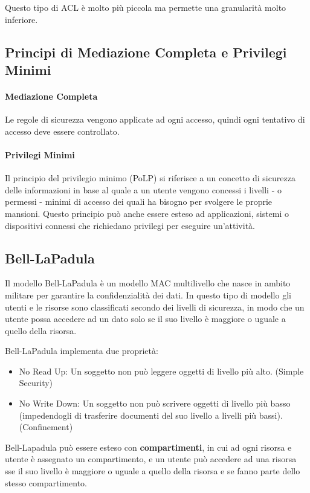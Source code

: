 \documentclass[12pt, a4paper, openany]{book}
\begin{document}
Questo tipo di ACL è molto più piccola ma permette una granularità molto inferiore.

\subsection{Principi di Mediazione Completa e Privilegi Minimi}
\paragraph{Mediazione Completa} Le regole di sicurezza vengono applicate ad ogni accesso, quindi ogni tentativo di accesso deve essere controllato.
\paragraph{Privilegi Minimi} Il principio del privilegio minimo (PoLP) si riferisce a un concetto di sicurezza delle informazioni in base al quale a un utente vengono concessi i livelli - o permessi - minimi di accesso dei quali ha bisogno per svolgere le proprie mansioni.
Questo principio può anche essere esteso ad applicazioni, sistemi o dispositivi connessi che richiedano privilegi per eseguire un'attività.

\subsection{Bell-LaPadula}
Il modello Bell-LaPadula è un modello MAC multilivello che nasce in ambito militare per garantire la confidenzialità dei dati.
In questo tipo di modello gli utenti e le risorse sono classificati secondo dei livelli di sicurezza, in modo che un utente possa accedere ad un dato solo se il suo livello è maggiore o uguale a quello della risorsa.

Bell-LaPadula implementa due proprietà:
\begin{itemize}
    \item No Read Up: Un soggetto non può leggere oggetti di livello più alto. (Simple Security)
    \item No Write Down: Un soggetto non può scrivere oggetti di livello più basso (impedendogli di trasferire documenti del suo livello a livelli più bassi). (Confinement)
\end{itemize}

Bell-Lapadula può essere esteso con \textbf{compartimenti}, in cui ad ogni risorsa e utente è assegnato un compartimento, e un utente può accedere ad una risorsa sse il suo livello è maggiore o uguale a quello della risorsa e se fanno parte dello stesso compartimento.
\end{document}

